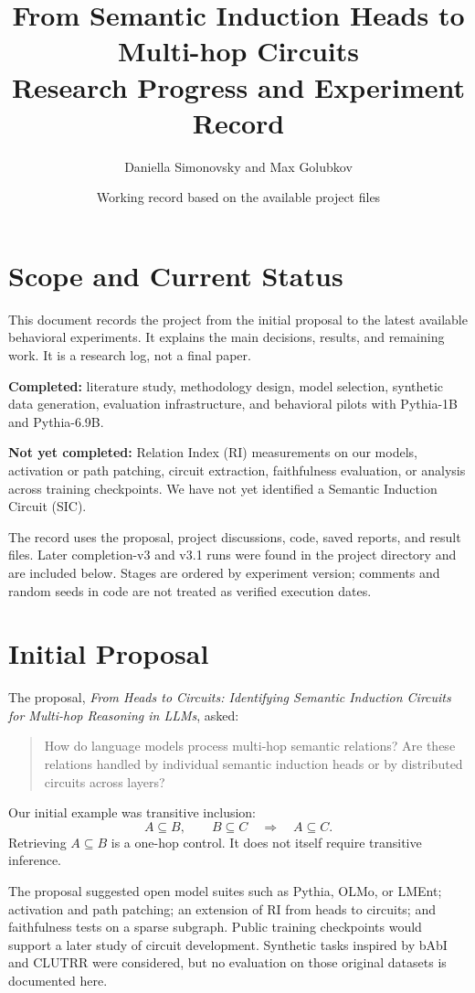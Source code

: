 \documentclass[11pt,a4paper]{article}
\title{From Semantic Induction Heads to Multi-hop Circuits\\
\large Research Progress and Experiment Record}
\author{Daniella Simonovsky and Max Golubkov}
\date{Working record based on the available project files}
\begin{document}
\maketitle

\section{Scope and Current Status}
This document records the project from the initial proposal to the latest available behavioral experiments. It explains the main decisions, results, and remaining work. It is a research log, not a final paper.

\textbf{Completed:} literature study, methodology design, model selection, synthetic data generation, evaluation infrastructure, and behavioral pilots with Pythia-1B and Pythia-6.9B.

\textbf{Not yet completed:} Relation Index (RI) measurements on our models, activation or path patching, circuit extraction, faithfulness evaluation, or analysis across training checkpoints. We have not yet identified a Semantic Induction Circuit (SIC).

The record uses the proposal, project discussions, code, saved reports, and result files. Later completion-v3 and v3.1 runs were found in the project directory and are included below. Stages are ordered by experiment version; comments and random seeds in code are not treated as verified execution dates.

\section{Initial Proposal}
The proposal, \emph{From Heads to Circuits: Identifying Semantic Induction Circuits for Multi-hop Reasoning in LLMs}, asked:
\begin{quote}
How do language models process multi-hop semantic relations? Are these relations handled by individual semantic induction heads or by distributed circuits across layers?
\end{quote}
Our initial example was transitive inclusion:
\[
A\subseteq B,\qquad B\subseteq C \quad\Rightarrow\quad A\subseteq C.
\]
Retrieving $A\subseteq B$ is a one-hop control. It does not itself require transitive inference.

The proposal suggested open model suites such as Pythia, OLMo, or LMEnt; activation and path patching; an extension of RI from heads to circuits; and faithfulness tests on a sparse subgraph. Public training checkpoints would support a later study of circuit development. Synthetic tasks inspired by bAbI and CLUTRR were considered, but no evaluation on those original datasets is documented here.
\end{document}
